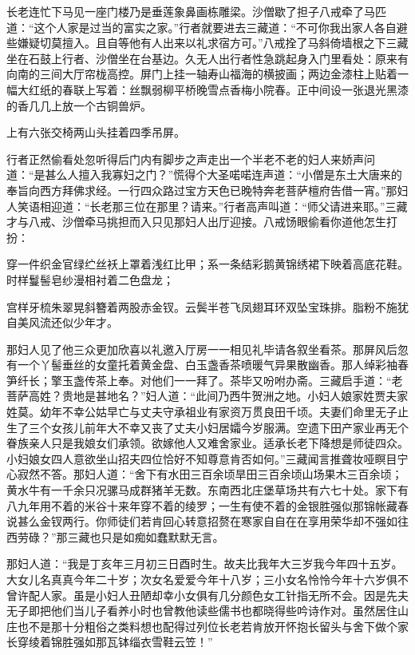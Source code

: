 \documentclass[12pt,UTF8]{ctexbook}
\begin{document}
{长老连忙下马见一座门楼乃是垂莲象鼻画栋雕梁。沙僧歇了担子八戒牵了马匹道：“这个人家是过当的富实之家。”行者就要进去三藏道：“不可你我出家人各自避些嫌疑切莫擅入。且自等他有人出来以礼求宿方可。”八戒拴了马斜倚墙根之下三藏坐在石鼓上行者、沙僧坐在台基边。久无人出行者性急跳起身入门里看处：原来有向南的三间大厅帘栊高控。屏门上挂一轴寿山福海的横披画；两边金漆柱上贴着一幅大红纸的春联上写着：丝飘弱柳平桥晚雪点香梅小院春。正中间设一张退光黑漆的香几几上放一个古铜兽炉。

上有六张交椅两山头挂着四季吊屏。

行者正然偷看处忽听得后门内有脚步之声走出一个半老不老的妇人来娇声问道：“是甚么人擅入我寡妇之门？”慌得个大圣喏喏连声道：“小僧是东土大唐来的奉旨向西方拜佛求经。一行四众路过宝方天色已晚特奔老菩萨檀府告借一宵。”那妇人笑语相迎道：“长老那三位在那里？请来。”行者高声叫道：“师父请进来耶。”三藏才与八戒、沙僧牵马挑担而入只见那妇人出厅迎接。八戒饧眼偷看你道他怎生打扮：

穿一件织金官绿纻丝袄上罩着浅红比甲；系一条结彩鹅黄锦绣裙下映着高底花鞋。时样鬘髻皂纱漫相衬着二色盘龙；

宫样牙梳朱翠晃斜簪着两股赤金钗。云鬓半苍飞凤翅耳环双坠宝珠排。脂粉不施犹自美风流还似少年才。

那妇人见了他三众更加欣喜以礼邀入厅房一一相见礼毕请各叙坐看茶。那屏风后忽有一个丫髻垂丝的女童托着黄金盘、白玉盏香茶喷暖气异果散幽香。那人绰彩袖春笋纤长；擎玉盏传茶上奉。对他们一一拜了。茶毕又吩咐办斋。三藏启手道：“老菩萨高姓？贵地是甚地名？”妇人道：“此间乃西牛贺洲之地。小妇人娘家姓贾夫家姓莫。幼年不幸公姑早亡与丈夫守承祖业有家资万贯良田千顷。夫妻们命里无子止生了三个女孩儿前年大不幸又丧了丈夫小妇居孀今岁服满。空遗下田产家业再无个眷族亲人只是我娘女们承领。欲嫁他人又难舍家业。适承长老下降想是师徒四众。小妇娘女四人意欲坐山招夫四位恰好不知尊意肯否如何。”三藏闻言推聋妆哑瞑目宁心寂然不答。那妇人道：“舍下有水田三百余顷旱田三百余顷山场果木三百余顷；黄水牛有一千余只况骡马成群猪羊无数。东南西北庄堡草场共有六七十处。家下有八九年用不着的米谷十来年穿不着的绫罗；一生有使不着的金银胜强似那锦帐藏春说甚么金钗两行。你师徒们若肯回心转意招赘在寒家自自在在享用荣华却不强如往西劳碌？”那三藏也只是如痴如蠢默默无言。

那妇人道：“我是丁亥年三月初三日酉时生。故夫比我年大三岁我今年四十五岁。大女儿名真真今年二十岁；次女名爱爱今年十八岁；三小女名怜怜今年十六岁俱不曾许配人家。虽是小妇人丑陋却幸小女俱有几分颜色女工针指无所不会。因是先夫无子即把他们当儿子看养小时也曾教他读些儒书也都晓得些吟诗作对。虽然居住山庄也不是那十分粗俗之类料想也配得过列位长老若肯放开怀抱长留头与舍下做个家长穿绫着锦胜强如那瓦钵缁衣雪鞋云笠！”

}
\end{document}
